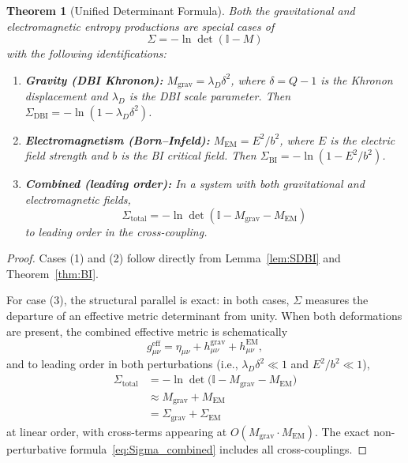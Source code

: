 \documentclass[letterpaper,twocolumn,superscriptaddress,longbibliography]{revtex4-2}
\newtheorem{theorem}{Theorem}[section]
\newcommand{\Sgrav}{\Sigma_{\mathrm{grav}}}
\newcommand{\SEM}{\Sigma_{\mathrm{EM}}}
\newcommand{\SDBI}{\Sigma_{\mathrm{DBI}}}
\newcommand{\SBI}{\Sigma_{\mathrm{BI}}}
\newcommand{\Stot}{\Sigma_{\mathrm{total}}}
\begin{document}
\begin{theorem}[Unified Determinant Formula]
\label{thm:unified_det}
Both the gravitational and electromagnetic entropy productions
are special cases of
\begin{equation}
  \boxed{\;
  \Sigma = -\ln\det(\mathbb{I} - M)
  \;}
  \label{eq:Sigma_unified}
\end{equation}
with the following identifications:
\begin{enumerate}
  \item \textbf{Gravity (DBI Khronon):}
        $M_{\mathrm{grav}} = \lambda_D\delta^2$, where
        $\delta = Q - 1$ is the Khronon displacement and
        $\lambda_D$ is the DBI scale parameter.
        Then $\SDBI = -\ln(1 - \lambda_D\delta^2)$.
  \item \textbf{Electromagnetism (Born--Infeld):}
        $M_{\mathrm{EM}} = E^2/b^2$, where $E$ is the
        electric field strength and $b$ is the BI critical
        field.
        Then $\SBI = -\ln(1 - E^2/b^2)$.
  \item \textbf{Combined (leading order):}
        In a system with both gravitational and electromagnetic
        fields,
        \begin{equation}
          \Stot = -\ln\det(\mathbb{I} - M_{\mathrm{grav}}
                  - M_{\mathrm{EM}})
          \label{eq:Sigma_combined}
        \end{equation}
        to leading order in the cross-coupling.
\end{enumerate}
\end{theorem}

\begin{proof}
Cases (1) and (2) follow directly from
Lemma~\ref{lem:SDBI} and Theorem~\ref{thm:BI}.

For case (3), the structural parallel is exact:
in both cases, $\Sigma$ measures the departure of an
effective metric determinant from unity.
When both deformations are present, the combined effective
metric is schematically
\begin{equation}
  g_{\mu\nu}^{\mathrm{eff}}
  = \eta_{\mu\nu} + h_{\mu\nu}^{\mathrm{grav}}
  + h_{\mu\nu}^{\mathrm{EM}},
  \label{eq:g_eff_combined}
\end{equation}
and to leading order in both perturbations
(i.e., $\lambda_D\delta^2 \ll 1$ and $E^2/b^2 \ll 1$),
\begin{align}
  \Stot &= -\ln\det\!\bigl(\mathbb{I}
         - M_{\mathrm{grav}} - M_{\mathrm{EM}}\bigr)
  \nonumber \\
  &\approx M_{\mathrm{grav}} + M_{\mathrm{EM}}
  \nonumber \\
  &= \Sgrav + \SEM
  \label{eq:Sigma_additive}
\end{align}
at linear order, with cross-terms appearing at
$O(M_{\mathrm{grav}}\cdot M_{\mathrm{EM}})$.
The exact non-perturbative formula~\eqref{eq:Sigma_combined}
includes all cross-couplings.
\end{proof}
\end{document}
